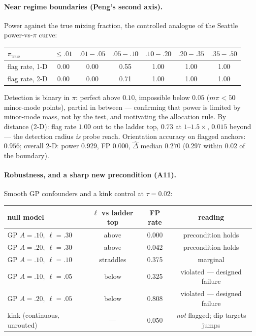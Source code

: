 \documentclass[11pt]{article}
\begin{document}
\paragraph{Near regime boundaries (Peng's second axis).} Power against the true mixing
fraction, the controlled analogue of the Seattle power-vs-$\pi$ curve:

\begin{center}\small
\begin{tabular}{lcccccc}
\toprule
$\pi_{\mathrm{true}}$ & $\le .01$ & $.01\!-\!.05$ & $.05\!-\!.10$ & $.10\!-\!.20$ & $.20\!-\!.35$ & $.35\!-\!.50$\\
\midrule
flag rate, 1-D & 0.00 & 0.00 & 0.55 & 1.00 & 1.00 & 1.00\\
flag rate, 2-D & 0.00 & 0.00 & 0.71 & 1.00 & 1.00 & 1.00\\
\bottomrule
\end{tabular}
\end{center}

Detection is binary in $\pi$: perfect above $0.10$, impossible below $0.05$ ($m\pi<50$
minor-mode points), partial in between --- confirming that power is limited by minor-mode
mass, not by the test, and motivating the allocation rule. By distance (2-D): flag rate
$1.00$ out to the ladder top, $0.73$ at $1$--$1.5\times$, $0.015$ beyond --- the detection
radius \emph{is} probe reach. Orientation accuracy on flagged anchors: $0.956$; overall 2-D:
power $0.929$, FP $0.000$, $\widehat\Delta$ median $0.270$ ($0.297$ within $0.02$ of the
boundary).

\paragraph{Robustness, and a sharp new precondition (A11).} Smooth GP confounders and a
kink control at $\tau=0.02$:

\begin{center}\small
\begin{tabular}{lccc}
\toprule
null model & $\ell$ vs ladder top & FP rate & reading\\
\midrule
GP $A{=}.10,\ \ell{=}.30$ & above & 0.000 & precondition holds\\
GP $A{=}.20,\ \ell{=}.30$ & above & 0.042 & precondition holds\\
GP $A{=}.10,\ \ell{=}.10$ & straddles & 0.375 & marginal\\
GP $A{=}.10,\ \ell{=}.05$ & below & 0.325 & violated --- designed failure\\
GP $A{=}.20,\ \ell{=}.05$ & below & 0.808 & violated --- designed failure\\
kink (continuous, unrouted) & --- & 0.050 & \emph{not} flagged; dip targets jumps\\
\bottomrule
\end{tabular}
\end{center}
\end{document}
